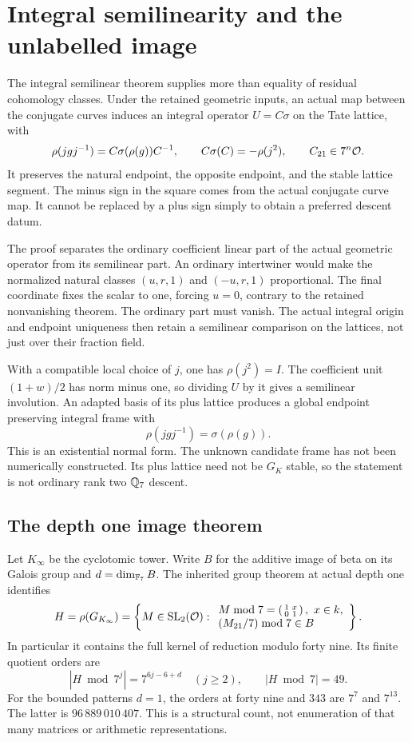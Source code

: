 \section{Integral semilinearity and the unlabelled image}\label{sec:image}
The integral semilinear theorem supplies more than equality of residual cohomology classes. Under the retained geometric inputs, an actual map between the conjugate curves induces an integral operator $U=C\sigma$ on the Tate lattice, with
\[
\rho(jgj^{-1})=C\sigma(\rho(g))C^{-1},\qquad
C\sigma(C)=-\rho(j^2),\qquad C_{21}\in7^n\mathcal O.
\]
It preserves the natural endpoint, the opposite endpoint, and the stable lattice segment. The minus sign in the square comes from the actual conjugate curve map. It cannot be replaced by a plus sign simply to obtain a preferred descent datum.

The proof separates the ordinary coefficient linear part of the actual geometric operator from its semilinear part. An ordinary intertwiner would make the normalized natural classes $(u,r,1)$ and $(-u,r,1)$ proportional. The final coordinate fixes the scalar to one, forcing $u=0$, contrary to the retained nonvanishing theorem. The ordinary part must vanish. The actual integral origin and endpoint uniqueness then retain a semilinear comparison on the lattices, not just over their fraction field.

With a compatible local choice of $j$, one has $\rho(j^2)=I$. The coefficient unit $(1+w)/2$ has norm minus one, so dividing $U$ by it gives a semilinear involution. An adapted basis of its plus lattice produces a global endpoint preserving integral frame with
\[
\rho(jgj^{-1})=\sigma(\rho(g)).
\]
This is an existential normal form. The unknown candidate frame has not been numerically constructed. Its plus lattice need not be $G_K$ stable, so the statement is not ordinary rank two $\mathbb Q_7$ descent.

\subsection{The depth one image theorem}
Let $K_\infty$ be the cyclotomic tower. Write $B$ for the additive image of beta on its Galois group and $d=\dim_{\mathbb F_7}B$. The inherited group theorem at actual depth one identifies
\begin{equation}\label{eq:imagegroup}
H=\rho(G_{K_\infty})=
\left\{M\in\mathrm{SL}_2(\Oloc):
\begin{array}{l}
M\bmod7=\left(\begin{smallmatrix}1&x\\0&1\end{smallmatrix}\right),\ x\in k,\\
(M_{21}/7)\bmod7\in B
\end{array}\right\}.
\end{equation}
In particular it contains the full kernel of reduction modulo forty nine. Its finite quotient orders are
\[
|H\bmod7^j|=7^{6j-6+d}\quad(j\ge2),\qquad|H\bmod7|=49.
\]
For the bounded patterns $d=1$, the orders at forty nine and $343$ are $7^7$ and $7^{13}$. The latter is $96\,889\,010\,407$. This is a structural count, not enumeration of that many matrices or arithmetic representations.

